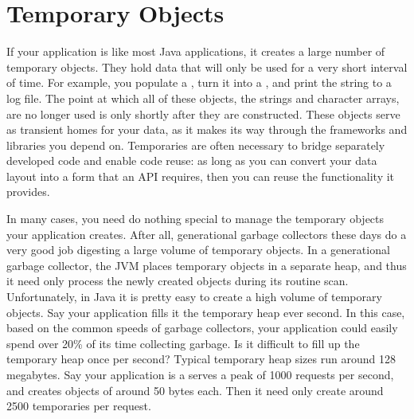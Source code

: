 \section{Temporary Objects}
\label{temporary-lifetime}

If your application is like most Java applications, it creates a large number of
temporary objects. They hold data that will only be used for a very short
interval of time. For example, you populate a , turn it into
a , and print the string to a log file. The point at which all of
these objects, the strings and character arrays, are no longer used is only
shortly after they are constructed. These objects serve as transient homes for
your data, as it makes its way through the frameworks and libraries you depend
on. Temporaries are often necessary to bridge separately developed code and
enable code reuse: as long as you can convert your data layout into a form that
an API requires, then you can reuse the functionality it provides.

In many cases, you need do nothing special to manage the temporary objects your
application creates. After all, generational garbage collectors these days do a
very good job digesting a large volume of temporary objects. In a generational
garbage collector, the JVM places temporary objects in a separate heap, and
thus it need only process the newly created objects during its routine scan.
Unfortunately, in Java it is pretty easy to create a high volume of temporary
objects. Say your application 
fills it the temporary heap ever second. In this case, based on the common
speeds of garbage collectors, your application could easily spend over 20\% of its time
collecting garbage.
Is it difficult to fill up the temporary heap once per second? Typical
temporary heap sizes run around 128 megabytes. Say your application is a serves
a peak of 1000 requests per second, and creates objects of around 50 bytes each.
Then it need only create around 2500 temporaries per request. 



